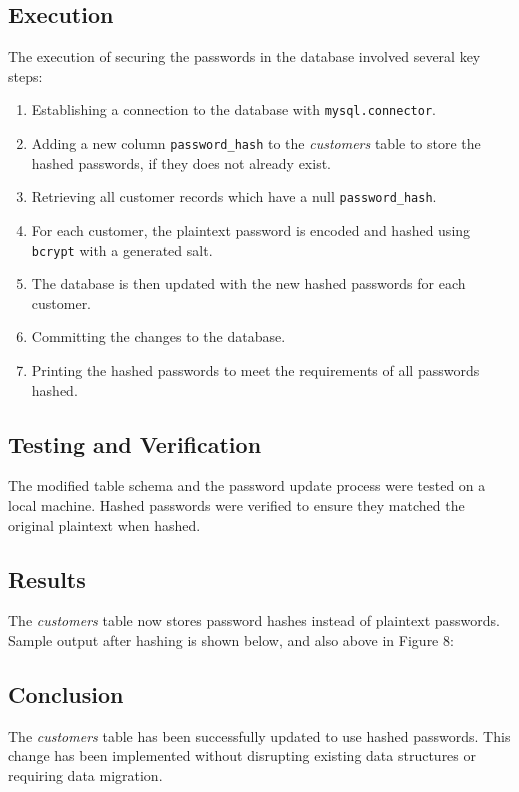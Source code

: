 \documentclass{article}
\begin{document}
\subsection*{Execution}
The execution of securing the passwords in the database involved several key steps:
\begin{enumerate}
    \item Establishing a connection to the database with \texttt{mysql.connector}.
    \item Adding a new column \texttt{password\_hash} to the \textit{customers} table to store the hashed passwords, if they does not already exist.
    \item Retrieving all customer records which have a null \texttt{password\_hash}.
    \item For each customer, the plaintext password is encoded and hashed using \texttt{bcrypt} with a generated salt.
    \item The database is then updated with the new hashed passwords for each customer.
    \item Committing the changes to the database.
    \item Printing the hashed passwords to meet the requirements of all passwords hashed.
\end{enumerate}

\subsection*{Testing and Verification}
The modified table schema and the password update process were tested on a local machine. Hashed passwords were verified to ensure they matched the original plaintext when hashed.

\subsection*{Results}
The \textit{customers} table now stores password hashes instead of plaintext passwords. Sample output after hashing is shown below, and also above in Figure 8:



\subsection*{Conclusion}
The \textit{customers} table has been successfully updated to use hashed passwords. This change has been implemented without disrupting existing data structures or requiring data migration.
\end{document}
